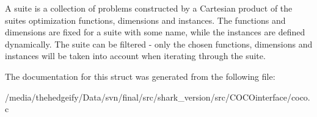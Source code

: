 A suite is a collection of problems constructed by a Cartesian product of the suite\textquotesingle{}s optimization functions, dimensions and instances. The functions and dimensions are fixed for a suite with some name, while the instances are defined dynamically. The suite can be filtered -\/ only the chosen functions, dimensions and instances will be taken into account when iterating through the suite. 

The documentation for this struct was generated from the following file\+:\begin{DoxyCompactItemize}
\item 
/media/thehedgeify/\+Data/svn/final/src/shark\+\_\+version/src/\+C\+O\+C\+Ointerface/coco.\+c\end{DoxyCompactItemize}
